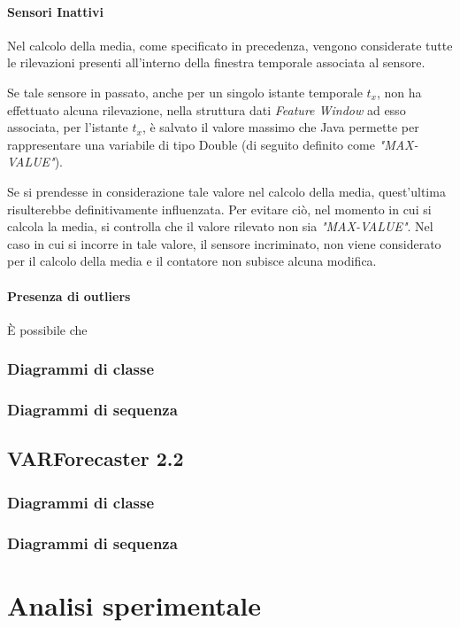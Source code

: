 \documentclass[12pt,a4paper,twoside,openright]{book}
\begin{document}
\subsubsection{Sensori Inattivi}
Nel calcolo della media, come specificato in precedenza, vengono considerate tutte le rilevazioni presenti all'interno della finestra temporale associata al sensore. 

Se tale sensore in passato, anche per un singolo istante temporale \textit{$t_{x}$}, non ha effettuato alcuna rilevazione, nella struttura dati \textit{Feature Window} ad esso associata, per l'istante \textit{$t_{x}$}, è salvato il valore massimo che Java permette per rappresentare una variabile di tipo Double (di seguito definito come \textit{"MAX-VALUE"}).


Se si prendesse in considerazione tale valore nel calcolo della media, quest'ultima risulterebbe definitivamente influenzata. Per evitare ciò, nel momento in cui si calcola la media, si controlla che il valore rilevato non sia \textit{"MAX-VALUE"}.
Nel caso in cui si incorre in tale valore, il sensore incriminato, non viene considerato per il calcolo della media e il contatore non subisce alcuna modifica.
 
\subsubsection{Presenza di outliers}
È possibile che 
\newpage
\subsection{Diagrammi di classe}
\newpage
\subsection{Diagrammi di sequenza}
\newpage
\section{VARForecaster 2.2}
\newpage
\subsection{Diagrammi di classe}
\newpage
\subsection{Diagrammi di sequenza}

\chapter{Analisi sperimentale}
\newpage
\end{document}
